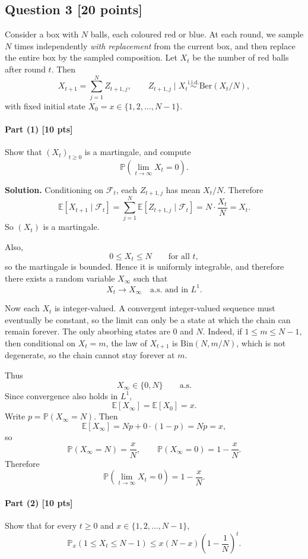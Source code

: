 \documentclass[11pt]{article}
\theoremstyle{definition}
\begin{document}
\subsection*{Question 3 \hfill [20 points]}
Consider a box with \(N\) balls, each coloured red or blue. At each round, we sample \(N\) times independently \emph{with replacement} from the current box, and then replace the entire box by the sampled composition. Let \(X_t\) be the number of red balls after round \(t\). Then
\[
X_{t+1}=\sum_{j=1}^N Z_{t+1,j},
\qquad
Z_{t+1,j}\mid X_t \stackrel{\text{i.i.d.}}{\sim} \mathrm{Ber}(X_t/N),
\]
with fixed initial state \(X_0=x\in\{1,2,\dots,N-1\}.\)

\paragraph{Part (1) \hfill [10 pts]}
Show that \((X_t)_{t\ge 0}\) is a martingale, and compute
\[
\mathbb P\!\left(\lim_{t\to\infty} X_t=0\right).
\]

\textbf{Solution.}
Conditioning on \(\mathcal F_t\), each \(Z_{t+1,j}\) has mean \(X_t/N\). Therefore
\[
\mathbb E[X_{t+1}\mid \mathcal F_t]
=
\sum_{j=1}^N \mathbb E[Z_{t+1,j}\mid \mathcal F_t]
=
N\cdot \frac{X_t}{N}
=
X_t.
\]
So \((X_t)\) is a martingale.

Also,
\[
0\le X_t\le N
\qquad \text{for all } t,
\]
so the martingale is bounded. Hence it is uniformly integrable, and therefore there exists a random variable \(X_\infty\) such that
\[
X_t\to X_\infty \quad \text{a.s. and in } L^1.
\]

Now each \(X_t\) is integer-valued. A convergent integer-valued sequence must eventually be constant, so the limit can only be a state at which the chain can remain forever. The only absorbing states are \(0\) and \(N\). Indeed, if \(1\le m\le N-1\), then conditional on \(X_t=m\), the law of \(X_{t+1}\) is \(\mathrm{Bin}(N,m/N)\), which is not degenerate, so the chain cannot stay forever at \(m\).

Thus
\[
X_\infty\in\{0,N\}
\qquad \text{a.s.}
\]
Since convergence also holds in \(L^1\),
\[
\mathbb E[X_\infty]=\mathbb E[X_0]=x.
\]
Write \(p=\mathbb P(X_\infty=N)\). Then
\[
\mathbb E[X_\infty]=Np+0\cdot (1-p)=Np=x,
\]
so
\[
\mathbb P(X_\infty=N)=\frac{x}{N},
\qquad
\mathbb P(X_\infty=0)=1-\frac{x}{N}.
\]
Therefore
\[
\mathbb P\!\left(\lim_{t\to\infty} X_t=0\right)=1-\frac{x}{N}.
\]

\paragraph{Part (2) \hfill [10 pts]}
Show that for every \(t\ge 0\) and \(x\in\{1,2,\dots,N-1\}\),
\[
\mathbb P_x(1\le X_t\le N-1)
\le
x(N-x)\left(1-\frac1N\right)^t.
\]
\end{document}
